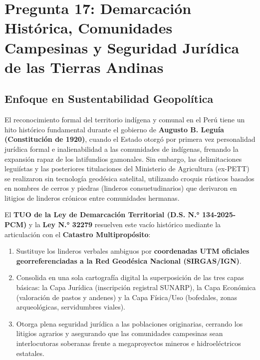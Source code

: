 \documentclass[11pt,a4paper]{article}
\begin{document}
\newpage

\section{Pregunta 17: Demarcación Histórica, Comunidades Campesinas y Seguridad Jurídica de las Tierras Andinas}

\subsection{Enfoque en Sustentabilidad Geopolítica}
El reconocimiento formal del territorio indígena y comunal en el Perú tiene un hito histórico fundamental durante el gobierno de \textbf{Augusto B. Leguía (Constitución de 1920)}, cuando el Estado otorgó por primera vez personalidad jurídica formal e inalienabilidad a las comunidades de indígenas, frenando la expansión rapaz de los latifundios gamonales. Sin embargo, las delimitaciones leguiístas y las posteriores titulaciones del Ministerio de Agricultura (ex-PETT) se realizaron sin tecnología geodésica satelital, utilizando croquis rústicos basados en nombres de cerros y piedras (linderos consuetudinarios) que derivaron en litigios de linderos crónicos entre comunidades hermanas.

El \textbf{TUO de la Ley de Demarcación Territorial (D.S. N.° 134-2025-PCM)} y la \textbf{Ley N.° 32279} resuelven este vacío histórico mediante la articulación con el \textbf{Catastro Multipropósito}:
\begin{enumerate}
    \item Sustituye los linderos verbales ambiguos por \textbf{coordenadas UTM oficiales georreferenciadas a la Red Geodésica Nacional (SIRGAS/IGN)}.
    \item Consolida en una sola cartografía digital la superposición de las tres capas básicas: la Capa Jurídica (inscripción registral SUNARP), la Capa Económica (valoración de pastos y andenes) y la Capa Física/Uso (bofedales, zonas arqueológicas, servidumbres viales).
    \item Otorga plena seguridad jurídica a las poblaciones originarias, cerrando los litigios agrarios y asegurando que las comunidades campesinas sean interlocutoras soberanas frente a megaproyectos mineros e hidroeléctricos estatales.
\end{enumerate}
\end{document}

